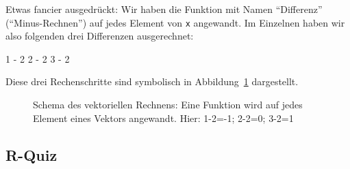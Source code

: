 \documentclass[
  a4paper,
]{scrbook}
\newenvironment{Shaded}{\begin{snugshade}}{\end{snugshade}}
\newcommand{\DecValTok}[1]{\textcolor[rgb]{0.68,0.00,0.00}{#1}}
\newcommand{\SpecialCharTok}[1]{\textcolor[rgb]{0.37,0.37,0.37}{#1}}
\theoremstyle{definition}
\theoremstyle{definition}
\theoremstyle{definition}
\theoremstyle{remark}
\begin{document}
Etwas fancier ausgedrückt: Wir haben die Funktion mit Namen
``Differenz'' (``Minus-Rechnen'') auf jedes Element von \texttt{x}
angewandt. Im Einzelnen haben wir also folgenden drei Differenzen
ausgerechnet:

\begin{Shaded}
\begin{Highlighting}[]
\DecValTok{1} \SpecialCharTok{{-}} \DecValTok{2}
\DecValTok{2} \SpecialCharTok{{-}} \DecValTok{2}
\DecValTok{3} \SpecialCharTok{{-}} \DecValTok{2}
\end{Highlighting}
\end{Shaded}

Diese drei Rechenschritte sind symbolisch in
Abbildung~\ref{fig-vektoriell} dargestellt.

\begin{figure}


\caption{\label{fig-vektoriell}Schema des vektoriellen Rechnens: Eine
Funktion wird auf jedes Element eines Vektors angewandt. Hier: 1-2=-1;
2-2=0; 3-2=1}

\end{figure}%

\subsection{R-Quiz}\label{r-quiz}
\end{document}

